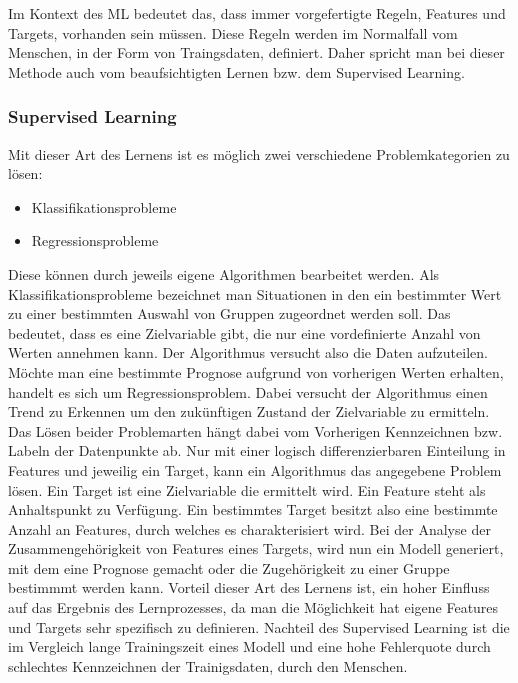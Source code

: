 \documentclass[12pt,german,ngerman]{report}
\begin{document}
        Im Kontext des ML bedeutet das, dass immer vorgefertigte Regeln, Features und Targets, vorhanden sein müssen.
        Diese Regeln werden im Normalfall vom Menschen, in der Form von Traingsdaten, definiert. Daher spricht man bei dieser Methode
        auch vom beaufsichtigten Lernen bzw. dem Supervised Learning.

        \subsubsection{Supervised Learning}
            Mit dieser Art des Lernens ist es möglich zwei verschiedene 
            Problemkategorien zu lösen\cite{supervisedlearning2021ibm}:

            \begin{itemize}
                \item{Klassifikationsprobleme}
                \item{Regressionsprobleme}
            \end{itemize}

            Diese können durch jeweils eigene Algorithmen bearbeitet werden.
            Als Klassifikationsprobleme bezeichnet man Situationen in den ein bestimmter Wert zu einer
            bestimmten Auswahl von Gruppen zugeordnet werden soll. Das bedeutet, dass es eine Zielvariable gibt, die
            nur eine vordefinierte Anzahl von Werten annehmen kann.\cite{kibuisness2021supervised}
            Der Algorithmus versucht also die Daten aufzuteilen.
            Möchte man eine bestimmte Prognose aufgrund von vorherigen Werten erhalten,
            handelt es sich um Regressionsproblem.\cite{kibuisness2021supervised}
            Dabei versucht der Algorithmus einen Trend zu Erkennen um den zukünftigen Zustand der Zielvariable zu ermitteln. 
            Das Lösen beider Problemarten hängt dabei vom Vorherigen Kennzeichnen bzw. Labeln der Datenpunkte ab.
            Nur mit einer logisch differenzierbaren Einteilung in Features und jeweilig ein Target, 
            kann ein Algorithmus das angegebene Problem lösen.
            Ein Target ist eine Zielvariable die ermittelt wird. 
            Ein Feature steht als Anhaltspunkt zu Verfügung.
            Ein bestimmtes Target
            besitzt also eine bestimmte Anzahl an Features, durch welches es charakterisiert wird.
            Bei der Analyse der Zusammengehörigkeit von Features eines Targets, wird nun ein Modell
            generiert, mit dem eine Prognose gemacht oder die Zugehörigkeit zu einer Gruppe bestimmmt werden kann.
            Vorteil dieser Art des Lernens ist, ein hoher Einfluss auf das Ergebnis des Lernprozesses,
            da man die Möglichkeit hat eigene Features und Targets sehr spezifisch zu definieren.
            Nachteil des Supervised Learning ist die im Vergleich lange Trainingszeit eines Modell
            und eine hohe Fehlerquote durch schlechtes Kennzeichnen der Trainigsdaten, durch den Menschen.
            
\end{document}
